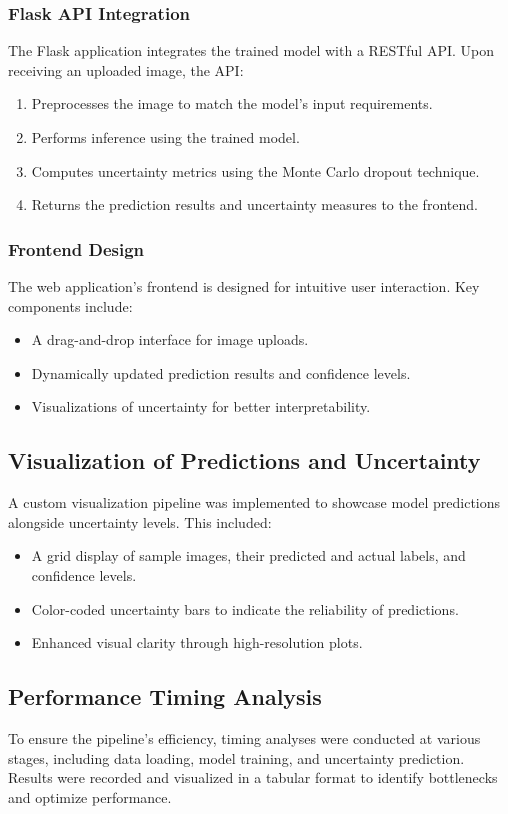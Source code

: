 \documentclass[12pt,onecolumn]{report}
\begin{document}
\subsubsection{Flask API Integration}
The Flask application integrates the trained model with a RESTful API. Upon receiving an uploaded image, the API:
\begin{enumerate}
    \item Preprocesses the image to match the model's input requirements.
    \item Performs inference using the trained model.
    \item Computes uncertainty metrics using the Monte Carlo dropout technique.
    \item Returns the prediction results and uncertainty measures to the frontend.
\end{enumerate}

\subsubsection{Frontend Design}
The web application's frontend is designed for intuitive user interaction. Key components include:
\begin{itemize}
    \item A drag-and-drop interface for image uploads.
    \item Dynamically updated prediction results and confidence levels.
    \item Visualizations of uncertainty for better interpretability.
\end{itemize}

\subsection{Visualization of Predictions and Uncertainty}
A custom visualization pipeline was implemented to showcase model predictions alongside uncertainty levels. This included:
\begin{itemize}
    \item A grid display of sample images, their predicted and actual labels, and confidence levels.
    \item Color-coded uncertainty bars to indicate the reliability of predictions.
    \item Enhanced visual clarity through high-resolution plots.
\end{itemize}

\subsection{Performance Timing Analysis}
To ensure the pipeline's efficiency, timing analyses were conducted at various stages, including data loading, model training, and uncertainty prediction. Results were recorded and visualized in a tabular format to identify bottlenecks and optimize performance.
\end{document}
